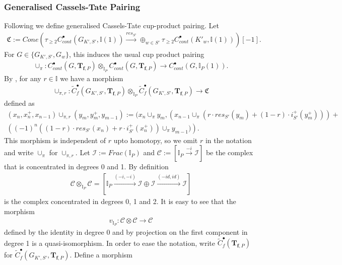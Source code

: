 \documentclass[reqno,10pt]{amsart}
\newcommand{\I}{\mathbb{I}}
\newcommand{\ip}{\I_P}
\newcommand{\tfp}{\mathbf{T}_{\mathbf{f},P}}
\theoremstyle{plain}
\theoremstyle{definition}
\begin{document}
\subsubsection{Generalised Cassels-Tate Pairing} \label{CT Pairing}
Following \cite[Section 10.2]{Nekovar} we define generalised Cassels-Tate cup-product pairing. Let 
\begin{align*}
    \mathfrak{C} := Cone \left(\tau_{\geq 2}C^\bullet_{cont}(G_{K',S'},\I(1)) \xrightarrow{res_{S'}} \oplus_{w \in S'} \tau_{\geq 2} C^\bullet_{cont}(K'_w,\I(1))\right)[-1]. 
\end{align*}
For $G \in \{G_{K',S'},G_w\}$, this induces the usual cup product pairing
\begin{align*}
    \cup_\pi : C^\bullet_{cont}(G,\tfp) \otimes_{\ip} C^\bullet_{cont}(G,\tfp) \rightarrow C^\bullet_{cont}(G,\ip(1)).
\end{align*}
By \cite[Proposition 1.3.2]{Nekovar}, for any $r \in \I$ we have a morphism
\begin{align*}
    \cup_{\pi,r} : \widetilde{C}^\bullet_f(G_{K',S'},\tfp) \otimes_{\ip} \widetilde{C}^\bullet_f(G_{K',S'},\tfp) \rightarrow \mathfrak{C}
\end{align*}
defined as
\begin{align*}
    (x_n,x_n^+,x_{n-1}) \cup_{\pi,r} (y_m,y_m^+,y_{m-1}) := (x_n \cup_\pi y_m, \left( x_{n-1} \cup_\pi(r \cdot res_{S'}(y_m) + (1-r) \cdot i_{S'}^+(y_m^+)) \right) + \\
    \left( (-1)^n((1-r) \cdot res_{S'}(x_n) + r \cdot i_{S'}^+(x_n^+)) \cup_\pi y_{m-1}) \right).
\end{align*}
This morphism is independent of $r$ upto homotopy, so we omit $r$ in the notation and write $\cup_\pi$ for $\cup_{\pi,r}$. Let $\mathscr{I} := Frac(\ip)$ and $\mathcal{C} := [\ip \xrightarrow{-i} \mathscr{I}]$ be the complex that is concentrated in degrees 0 and 1. By definition
\begin{align*}
    \mathcal{C} \otimes_{\ip} \mathcal{C} = [\ip \xrightarrow{(-i,-i)} \mathscr{I} \oplus \mathscr{I} \xrightarrow{(-id,id)} \mathscr{I}]
\end{align*}
is the complex concentrated in degrees 0, 1 and 2. It is easy to see that the morphism
\begin{align*}
    v_{\ip} : \mathcal{C} \otimes \mathcal{C} \rightarrow \mathcal{C}
\end{align*}
defined by the identity in degree 0 and by projection on the first component in degree 1 is a quasi-isomorphism. In order to ease the notation, write $\widetilde{C}^\bullet_f(\tfp)$ for $\widetilde{C}^\bullet_f(G_{K',S'},\tfp)$. Define a morphism
\end{document}

